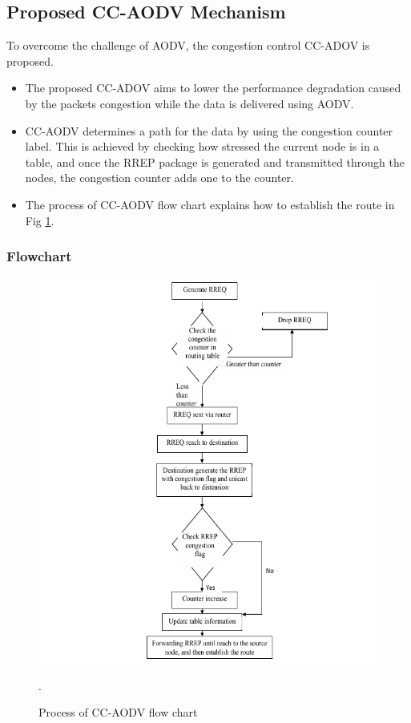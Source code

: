 \documentclass[12pt, a4paper]{article}
\begin{document}
\subsection{Proposed CC-AODV Mechanism}
To overcome the challenge of AODV, the congestion control CC-ADOV is proposed.
\begin{itemize}
    \item The proposed CC-ADOV aims to lower the performance
    degradation caused by the packets congestion while the data is
    delivered using AODV.
    \item CC-AODV determines a path for the data by using the congestion counter label. This is achieved by checking how stressed the current node is in a table, and once the RREP package is generated and transmitted through the nodes, the congestion counter adds one to the counter.
    \item The process of CC-AODV flow chart explains how to
establish the route in Fig \ref{fig:cc-aodv-algo}.
\end{itemize}
\subsubsection{Flowchart}
\begin{figure}[H]
\centering
\includegraphics[scale = 0.6]{images/cc-aodv/cc-aodv-algo.png}
\caption{Process of CC-AODV flow chart}.
\label{fig:cc-aodv-algo}
\end{figure}
\end{document}
